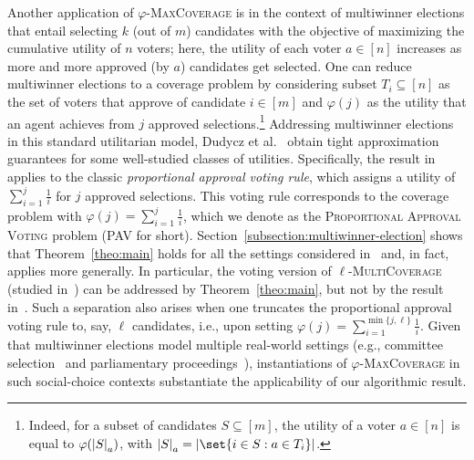 Another application of $\varphi$-\textsc{MaxCoverage} is in the context of multiwinner elections that entail selecting $k$ (out of $m$) candidates with the objective of maximizing the cumulative utility of $n$ voters; here, the utility of each voter $a \in [n]$ increases as more and more approved (by $a$) candidates get selected. One can reduce multiwinner elections to a coverage problem by considering subset $T_i \subseteq [n]$ as the set of voters that approve of candidate $i \in [m]$ and $\varphi(j)$ as the utility that an agent achieves from $j$ approved selections.\footnote{Indeed, for a subset of candidates $S \subseteq [m]$, the utility of a voter $a \in [n]$ is equal to $\varphi ( \abs{S}_a)$, with $\abs{S}_a = \abs{\set{i \in S : a \in T_i}}$.} Addressing multiwinner elections in this standard utilitarian model, Dudycz et al.~\cite{DMMS20} obtain tight approximation guarantees for some well-studied classes of utilities. Specifically, the result in~\cite{DMMS20} applies to the classic \emph{proportional approval voting rule}, which assigns a utility of $\sum_{i=1}^j \frac{1}{i}$ for $j$ approved selections. This voting rule corresponds to the coverage problem with $\varphi(j) = \sum_{i=1}^j \frac{1}{i}$, which we denote as the \textsc{Proportional Approval Voting} problem (\textsc{PAV} for short). Section~\ref{subsection:multiwinner-election} shows that Theorem~\ref{theo:main} holds for all the settings considered in~\cite{DMMS20} and, in fact, applies more generally. In particular, the voting version of $\ell$-\textsc{MultiCoverage} (studied in~\cite{SFL16}) can be addressed by Theorem~\ref{theo:main}, but not by the result in~\cite{DMMS20}. Such a separation also arises when one truncates the proportional approval voting rule to, say, $\ell$ candidates, i.e., upon setting $\varphi(j) = \sum_{i=1}^{\min \{ j, \ell\}} \frac{1}{i}$. Given that multiwinner elections model multiple real-world settings (e.g., committee selection~\cite{SFL16} and parliamentary proceedings~\cite{Brill2018}), instantiations of $\varphi$-\textsc{MaxCoverage} in such social-choice contexts substantiate the applicability of our algorithmic result.

